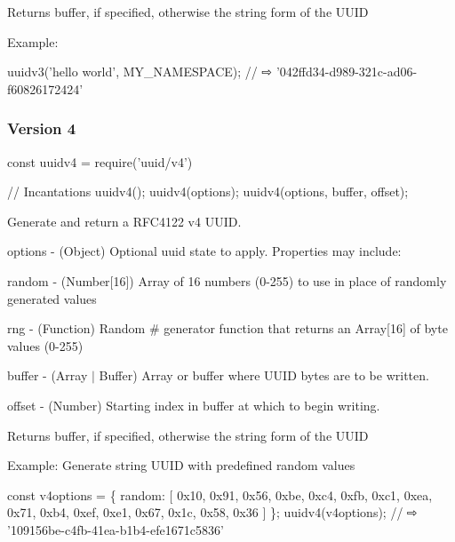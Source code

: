 Returns {\ttfamily buffer}, if specified, otherwise the string form of the U\+U\+ID

Example\+:


\begin{DoxyCode}
uuidv3('hello world', MY\_NAMESPACE);  // ⇨ '042ffd34-d989-321c-ad06-f60826172424'
\end{DoxyCode}


\subsubsection*{Version 4}


\begin{DoxyCode}
const uuidv4 = require('uuid/v4')

// Incantations
uuidv4();
uuidv4(options);
uuidv4(options, buffer, offset);
\end{DoxyCode}


Generate and return a R\+F\+C4122 v4 U\+U\+ID.


\begin{DoxyItemize}
\item {\ttfamily options} -\/ (Object) Optional uuid state to apply. Properties may include\+:
\begin{DoxyItemize}
\item {\ttfamily random} -\/ (Number\mbox{[}16\mbox{]}) Array of 16 numbers (0-\/255) to use in place of randomly generated values
\item {\ttfamily rng} -\/ (Function) Random \# generator function that returns an Array\mbox{[}16\mbox{]} of byte values (0-\/255)
\end{DoxyItemize}
\item {\ttfamily buffer} -\/ (Array $\vert$ Buffer) Array or buffer where U\+U\+ID bytes are to be written.
\item {\ttfamily offset} -\/ (Number) Starting index in {\ttfamily buffer} at which to begin writing.
\end{DoxyItemize}

Returns {\ttfamily buffer}, if specified, otherwise the string form of the U\+U\+ID

Example\+: Generate string U\+U\+ID with predefined {\ttfamily random} values


\begin{DoxyCode}
const v4options = \{
  random: [
    0x10, 0x91, 0x56, 0xbe, 0xc4, 0xfb, 0xc1, 0xea,
    0x71, 0xb4, 0xef, 0xe1, 0x67, 0x1c, 0x58, 0x36
  ]
\};
uuidv4(v4options); // ⇨ '109156be-c4fb-41ea-b1b4-efe1671c5836'
\end{DoxyCode}


